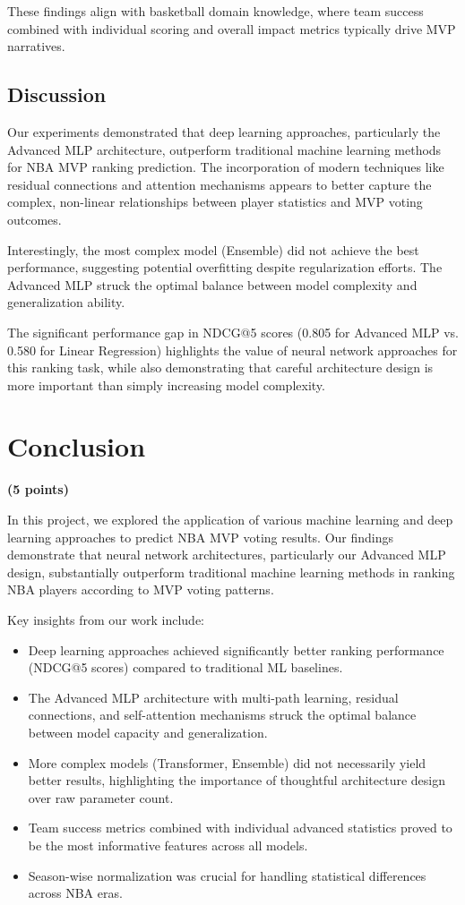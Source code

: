 \documentclass[10pt,twocolumn,letterpaper]{article}
\begin{document}
These findings align with basketball domain knowledge, where team success combined with individual scoring and overall impact metrics typically drive MVP narratives.

\subsection{Discussion}

Our experiments demonstrated that deep learning approaches, particularly the Advanced MLP architecture, outperform traditional machine learning methods for NBA MVP ranking prediction. The incorporation of modern techniques like residual connections and attention mechanisms appears to better capture the complex, non-linear relationships between player statistics and MVP voting outcomes.

Interestingly, the most complex model (Ensemble) did not achieve the best performance, suggesting potential overfitting despite regularization efforts. The Advanced MLP struck the optimal balance between model complexity and generalization ability.

The significant performance gap in NDCG@5 scores (0.805 for Advanced MLP vs. 0.580 for Linear Regression) highlights the value of neural network approaches for this ranking task, while also demonstrating that careful architecture design is more important than simply increasing model complexity.

\section{Conclusion}
\textbf{(5 points)}

In this project, we explored the application of various machine learning and deep learning approaches to predict NBA MVP voting results. Our findings demonstrate that neural network architectures, particularly our Advanced MLP design, substantially outperform traditional machine learning methods in ranking NBA players according to MVP voting patterns.

Key insights from our work include:

\begin{itemize}
    \item Deep learning approaches achieved significantly better ranking performance (NDCG@5 scores) compared to traditional ML baselines.
    \item The Advanced MLP architecture with multi-path learning, residual connections, and self-attention mechanisms struck the optimal balance between model capacity and generalization.
    \item More complex models (Transformer, Ensemble) did not necessarily yield better results, highlighting the importance of thoughtful architecture design over raw parameter count.
    \item Team success metrics combined with individual advanced statistics proved to be the most informative features across all models.
    \item Season-wise normalization was crucial for handling statistical differences across NBA eras.
\end{itemize}
\end{document}
